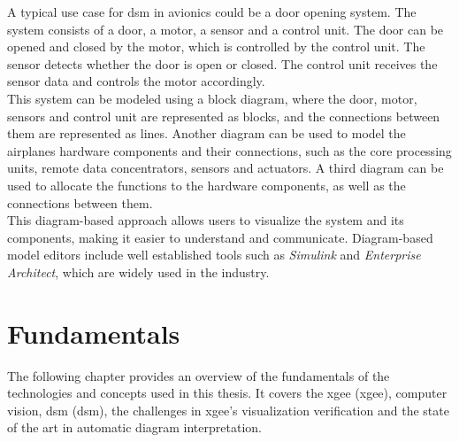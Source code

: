 A typical use case for \acrshort{dsm} in avionics could be a door opening system. The system consists of a door, a motor, a sensor and a control unit. The door can be opened and closed by the motor, which is controlled by the control unit. The sensor detects whether the door is open or closed. The control unit receives the sensor data and controls the motor accordingly.\\
This system can be modeled using a block diagram, where the door, motor, sensors and control unit are represented as blocks, and the connections between them are represented as lines. Another diagram can be used to model the airplanes hardware components and their connections, such as the core processing units, remote data concentrators, sensors and actuators. A third diagram can be used to allocate the functions to the hardware components, as well as the connections between them.\\
This diagram-based approach allows users to visualize the system and its components, making it easier to understand and communicate. Diagram-based model editors include well established tools such as \textit{Simulink} and \textit{Enterprise Architect}, which are widely used in the industry.

\chapter{Fundamentals}
\label{chp:fundamentals}
The following chapter provides an overview of the fundamentals of the technologies and concepts used in this thesis. It covers the \acrlong{xgee} (\acrshort{xgee}), computer vision, \acrlong{dsm} (\acrshort{dsm}), the challenges in \acrshort{xgee}'s visualization verification and the state of the art in automatic diagram interpretation.

